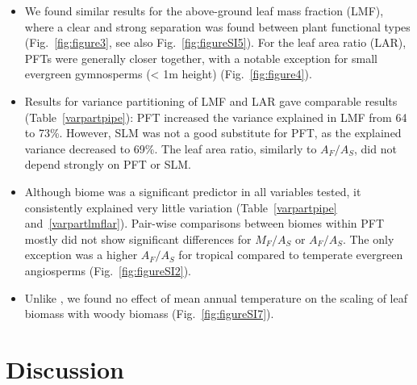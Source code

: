 \documentclass[a4paper]{article}\usepackage[]{graphicx}\usepackage[]{color}
\begin{document}
\begin{itemize}
\item We found similar results for the above-ground leaf mass fraction (LMF), where a clear and strong separation was found between plant functional types (Fig.~\ref{fig:figure3}, see also Fig.~\ref{fig:figureSI5}). For the leaf area ratio (LAR), PFTs were generally closer together, with a notable exception for small evergreen gymnosperms (< 1m height) (Fig.~\ref{fig:figure4}).

\item Results for variance partitioning of LMF and LAR gave comparable results (Table~\ref{varpartpipe}): PFT increased the variance explained in LMF from 64 to 73\%. However, SLM was not a good substitute for PFT, as the explained variance decreased to 69\%. The leaf area ratio, similarly to $A_F/A_S$, did not depend strongly on PFT or SLM.

\item Although biome was a significant predictor in all variables tested, it consistently explained very little variation (Table~\ref{varpartpipe} and~\ref{varpartlmflar}). Pair-wise comparisons between biomes within PFT mostly did not show significant differences for $M_F/A_S$ or $A_F/A_S$. The only exception was a higher $A_F/A_S$ for tropical compared to temperate evergreen angiosperms (Fig.~\ref{fig:figureSI2}).

\item Unlike \cite{reich_temperature_2014}, we found no effect of mean annual temperature on the scaling of leaf biomass with woody biomass (Fig.~\ref{fig:figureSI7}).


\end{itemize}


\section{Discussion}
\end{document}
